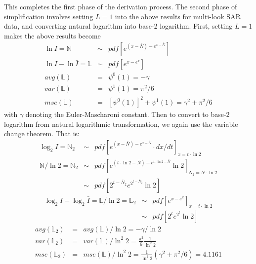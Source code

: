 \documentclass[journal]{IEEEtran}
\begin{document}
This completes the first phase of the derivation process.
The second phase of simplification involves setting $L=1$ into the above results for multi-look SAR data,
  and converting natural logarithm into base-2 logarithm.
First, setting $L=1$ makes the above results become
\begin{eqnarray*}
   \ln{I} = \mathbb{N} &\sim&  pdf \left[ e^{(x-\bar{N})-e^{x-\bar{N}}} \right] \\
   \ln{I} - \ln{\bar{I}} = \mathbb{L} &\sim& pdf \left[ e^{x-e^x}  \right] \\ 
    avg(\mathbb{L}) &=& \psi^0(1) = -\gamma \\
    var(\mathbb{L}) &=& \psi^1(1) = \pi^2 / 6 \\  
    mse(\mathbb{L}) &=& \left[ \psi^0(1) \right]^2 + \psi^1(1) = \gamma^2 + \pi^2 / 6
\end{eqnarray*}
with $\gamma$ denoting the Euler-Mascharoni constant.
Then to convert to base-2 logarithm from natural logarithmic transformation,
  we again use the variable change theorem.
  That is:
  \begin{eqnarray*}
   \log_2{I}  = \mathbb{N}_2    &\sim&  pdf \left[ e^{(x-\bar{N})-e^{x-\bar{N}}} \cdot dx/dt \right]_{x=t\cdot \ln{2}} \\
   \mathbb{N} / \ln{2} = \mathbb{N}_2 &\sim&  pdf \left[ e^{(t\cdot \ln{2}-\bar{N})-e^{t\cdot \ln{2}-\bar{N}}} \ln{2} \right]_{\bar{N}_2 = \bar{N} \cdot \ln{2}} \\
       &\sim&  pdf \left[ 2^{t-\bar{N}_2}e^{2^{t-\bar{N}_2}} \ln{2} \right] 
  \end{eqnarray*}
\begin{eqnarray*}
   \log_2{I} - \log_2{\bar{I}} = \mathbb{L} / \ln{2} = \mathbb{L}_2 &\sim& pdf \left[ e^{x-e^x}  \right]_{x=t \cdot \ln{2}} \\  
       &\sim& pdf \left[ 2^t e^{2^t} \ln{2}  \right] 
\end{eqnarray*}
\begin{eqnarray*}
  avg(\mathbb{L}_2) &=& avg(\mathbb{L})/ \ln{2} = -\gamma / \ln{2} \\
  var(\mathbb{L}_2) &=& var(\mathbb{L})/ \ln^2{2} = \frac{\pi^2}{6} \frac{1}{ \ln^2{2}} \\
  mse(\mathbb{L}_2) &=& mse(\mathbb{L})/ \ln^2{2} = \frac{1}{\ln^2{2}}( \gamma^2 + \pi^2/6 ) = 4.1161 
\end{eqnarray*}
\end{document}
